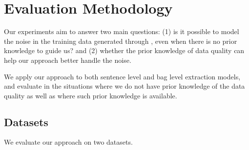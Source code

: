 \section{Evaluation Methodology}

Our experiments aim to answer two main questions:
(1) is it possible to model the noise in the training data generated through  \DS, even when there is no prior knowledge to guide us?
%
and (2) whether the prior knowledge of data quality can help our approach better handle the noise.

We apply our approach to both sentence level and bag level
extraction models, and evaluate in the situations where we do not have prior knowledge of
the data quality as well as %
where such prior knowledge is available.


\subsection{Datasets}
We evaluate our approach on two datasets.  %
%

